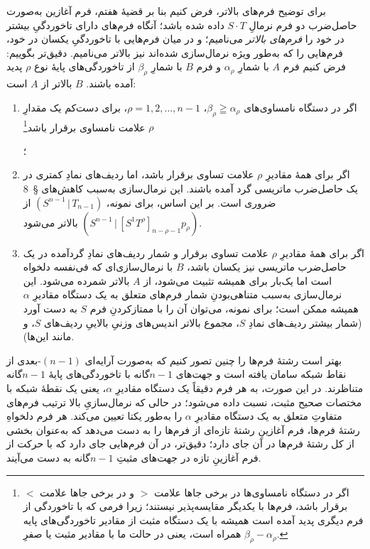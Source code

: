 \documentclass[11pt]{article}
\newcommand{\srcLTR}[1]{\relax\ifmmode\text{\mbox{\babelsublr{\foreignlanguage{english}{#1}}}}\else\babelsublr{\foreignlanguage{english}{#1}}\fi}
\newcommand{\srcfn}[2]{\begingroup\renewcommand{\thefootnote}{\srcLTR{#1}}\footnote{#2}\addtocounter{footnote}{-1}\endgroup}
\providecommand{\pair}[2]{(#1\,|\,#2)}
\begin{document}
برای توضیح فرم‌های بالاتر، فرض کنیم بنا بر قضیهٔ هفتم، فرم آغازین به‌صورت حاصل‌ضرب دو فرم نرمالِ $S\cdot T$ داده شده باشد؛ آنگاه فرم‌های دارای تاخوردگیِ بیشتر در خود را \emph{فرم‌های بالاتر} می‌نامیم؛ و در میان فرم‌هایی با تاخوردگیِ یکسان در خود، فرم‌هایی را که به‌طور ویژه نرمال‌سازی شده‌اند نیز بالاتر می‌نامیم. دقیق‌تر بگوییم: فرض کنیم فرم $A$ با شمارِ $\alpha_\rho$ و فرم $B$ با شمارِ $\beta_\rho$ از تاخوردگی‌های پایهٔ نوع $\rho$ پدید آمده باشند. $B$ بالاتر از $A$ است:
\begin{enumerate}
\renewcommand{\labelenumi}{\arabic{enumi})}
\item اگر در دستگاه نامساوی‌های $\beta_\rho\geqq\alpha_\rho$، $\rho=1,2,\ldots,n-1$، برای دست‌کم یک مقدارِ $\rho$ علامت نامساوی برقرار باشد\srcfn{**)}{اگر در دستگاه نامساوی‌ها در برخی جاها علامت $>$ و در برخی جاها علامت $<$ برقرار باشد، فرم‌ها با یکدیگر مقایسه‌پذیر نیستند؛ زیرا فرمی که با تاخوردگی از فرم دیگری پدید آمده است همیشه با یک دستگاه مثبت از مقادیر تاخوردگی‌های پایه همراه است، یعنی در حالت ما با مقادیر مثبت یا صفرِ $\beta_\rho-\alpha_\rho$.}؛
\item اگر برای همهٔ مقادیرِ $\rho$ علامت تساوی برقرار باشد، اما ردیف‌های نمادِ کمتری در یک حاصل‌ضرب ماتریسی گرد آمده باشند. این نرمال‌سازی به‌سبب کاهش‌های \S\ 8 ضروری است. بر این اساس، برای نمونه، $\pair{S^{n-1}}{T_{n-1}}$ از $\pair{S^{n-1}}{[S^1T^\rho]_{n-\rho-1}p_\rho}$ بالاتر می‌شود.
\item اگر برای همهٔ مقادیرِ $\rho$ علامت تساوی برقرار و شمار ردیف‌های نمادِ گردآمده در یک حاصل‌ضرب ماتریسی نیز یکسان باشد، $B$ با نرمال‌سازی‌ای که فی‌نفسه دلخواه است اما یک‌بار برای همیشه تثبیت می‌شود، از $A$ بالاتر شمرده می‌شود. این نرمال‌سازی به‌سبب متناهی‌بودنِ شمار فرم‌های متعلق به یک دستگاه مقادیرِ $\alpha$ همیشه ممکن است؛ برای نمونه، می‌توان آن را با ممتازکردنِ فرم $S$ به دست آورد (شمار بیشتر ردیف‌های نمادِ $S$، مجموع بالاتر اندیس‌های وزنیِ بالاییِ ردیف‌های $S$، و مانند این‌ها).
\end{enumerate}
بهتر است رشتهٔ فرم‌ها را چنین تصور کنیم که به‌صورت آرایه‌ای $(n-1)$-بعدی از نقاط شبکه سامان یافته است و جهت‌های $n-1$گانه با تاخوردگی‌های پایهٔ $n-1$گانه متناظرند. در این صورت، به هر فرم دقیقاً یک دستگاه مقادیرِ $\alpha$، یعنی یک نقطهٔ شبکه با مختصات صحیح مثبت، نسبت داده می‌شود؛ در حالی که نرمال‌سازیِ بالا ترتیب فرم‌های متفاوتِ متعلق به یک دستگاه مقادیرِ $\alpha$ را به‌طور یکتا تعیین می‌کند. هر فرم دلخواهِ رشتهٔ فرم‌ها، فرم آغازینِ رشتهٔ تازه‌ای از فرم‌ها را به دست می‌دهد که به‌عنوان بخشی از کل رشتهٔ فرم‌ها در آن جای دارد؛ دقیق‌تر، در آن فرم‌هایی جای دارد که با حرکت از فرم آغازینِ تازه در جهت‌های مثبتِ $n-1$گانه به دست می‌آیند.
\end{document}
